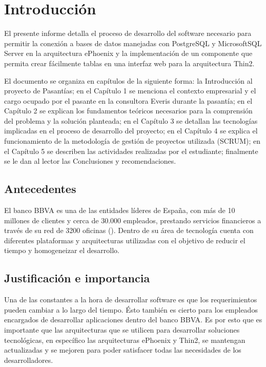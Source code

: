 \chapter*{Introducción}
\label{intro}
El presente informe detalla el proceso de desarrollo del software
necesario para permitir la conexión a bases de datos manejadas con
PostgreSQL y MicrosoftSQL Server en la arquitectura ePhoenix
y la implementación de un componente que permita crear fácilmente
tablas en una interfaz web para la arquitectura Thin2.

El documento se organiza en capítulos de la siguiente forma: la
Introducción al proyecto de Pasantías; en el Capítulo 1 se menciona
el contexto empresarial y el cargo ocupado por el pasante en la
consultora Everis durante la pasantía; en el Capítulo 2 se explican
los fundamentos teóricos necesarios para la comprensión del problema y
la solución planteada; en el Capítulo 3 se detallan las tecnologías
implicadas en el proceso de desarrollo del proyecto; en el Capítulo 4 se
explica el funcionamiento de la metodología de gestión de proyectos utilizada
(SCRUM); en el Capítulo 5 se describen las actividades realizadas por el
estudiante; finalmente se le dan al lector las Conclusiones y recomendaciones.

\section*{Antecedentes}
El banco BBVA es una de las entidades líderes de España, con más de 10
millones de clientes y cerca de 30.000 empleados, prestando servicios
financieros a través de su red de 3200 oficinas (\cite{BBVA}). Dentro de
su área de tecnología cuenta con diferentes plataformas y arquitecturas
utilizadas con el objetivo de reducir el tiempo y homogeneizar el desarrollo.

\section*{Justificación e importancia}
Una de las constantes a la hora de desarrollar software es que los
requerimientos pueden cambiar a lo largo del tiempo. Ésto también
es cierto para los empleados encargados de desarrollar aplicaciones
dentro del banco BBVA. Es por esto que es importante que las arquitecturas
que se utilicen para desarrollar soluciones tecnológicas, en específico
las arquitecturas ePhoenix y Thin2, se mantengan actualizadas y se mejoren
para poder satisfacer todas las necesidades de los desarrolladores.

